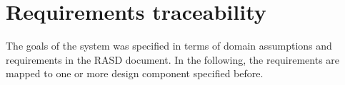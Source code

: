 \chapter{Requirements traceability}

The goals of the system was specified in terms of domain assumptions and requirements in the RASD document.
In the following, the requirements are mapped to one or more design component specified before.


